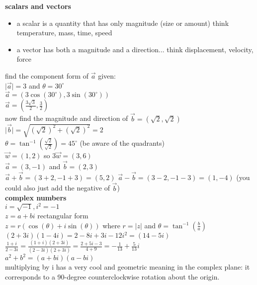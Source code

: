 \documentclass{article}
\begin{document}
\textbf{scalars and vectors}
	\begin{itemize}
		\item a scalar is a quantity that has only magnitude (size or amount) think temperature, mass, time, speed
		\item a vector has both a magnitude and a direction... think displacement, velocity, force
	\end{itemize}

	find the component form of $\vec{a}$ given:\\
	$\lvert\vec{a}\rvert = 3$ and $\theta = 30^{\circ}$\\
	$\vec{a} = (3\cos(30^{\circ}), 3\sin(30^{\circ}))$\\
	$\vec{a} = (\frac{3\sqrt{3}}{2}, \frac{3}{2})$\\

	now find the magnitude and direction of $\vec{b} = (\sqrt{2}, \sqrt{2})$\\
	$\lvert\vec{b}\rvert = \sqrt{(\sqrt{2})^2 + (\sqrt{2})^2} = 2$\\
	$\theta = \tan^{-1}(\frac{\sqrt{2}}{\sqrt{2}}) = 45^{\circ}$ (be aware of the quadrants)\\

	$\vec{w} = (1, 2)$ so $3\vec{w} = (3, 6)$\\

	$\vec{a} = (3, -1)$ and $\vec{b} = (2, 3)$\\
	$\vec{a} + \vec{b} = (3+2, -1+3) = (5, 2)$
	$\vec{a} - \vec{b} = (3-2, -1-3) = (1, -4)$ (you could also just add the negative of $\vec{b}$)\\

\textbf{complex numbers}\\
	$i = \sqrt{-1}, i^2 = -1$\\
	$z = a + bi$ rectangular form\\
	$z = r(\cos(\theta) + i\sin(\theta))$ where $r = \lvert z\rvert$ and $\theta = \tan^{-1}(\frac{b}{a})$\\

	$(2 + 3i)(1 - 4i) = 2 - 8i + 3i - 12i^2 = (14 - 5i)$\\
	$\frac{1 + i}{2 - 3i} = \frac{(1 + i)(2 + 3i)}{(2 - 3i)(2 + 3i)} = \frac{2 + 5i - 3}{4 + 9} = -\frac{1}{13} + \frac{5}{13}i$\\	
	$a^2 + b^2 = (a + bi)(a - bi)$\\

	multiplying by i has a very cool and geometric meaning in the complex plane: it corresponds to a 90-degree counterclockwise rotation about the origin.\\
\end{document}
